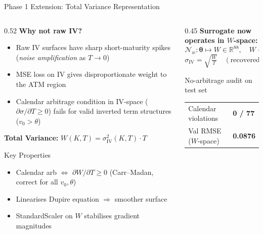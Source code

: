 \documentclass[aspectratio=169, 10pt]{beamer}
\begin{document}
\begin{frame}{Phase 1 Extension: Total Variance Representation}
  \begin{columns}[T]
    \begin{column}{0.52\textwidth}
      \textbf{Why not raw IV?}\\[0.4em]
      \begin{itemize}\small
        \item Raw IV surfaces have sharp short-maturity spikes
              (\emph{noise amplification} as $T\to0$)
        \item MSE loss on IV gives disproportionate weight to the ATM region
        \item Calendar arbitrage condition in IV-space
              ($\partial\sigma/\partial T\ge0$) fails for valid
              inverted term structures ($v_0>\theta$)
      \end{itemize}
      \vspace{0.5em}
      \textbf{Total Variance:}  $W(K,T) = \sigma_{\mathrm{IV}}^2(K,T)\cdot T$
      \vspace{0.3em}
      \begin{alertblock}{Key Properties}
        \small
        \begin{itemize}
          \item[$\checkmark$] Calendar arb $\Leftrightarrow$ $\partial W/\partial T \ge 0$
                             (Carr--Madan, correct for all $v_0,\theta$)
          \item[$\checkmark$] Linearises Dupire equation $\Rightarrow$ smoother surface
          \item[$\checkmark$] StandardScaler on $W$ stabilises gradient magnitudes
        \end{itemize}
      \end{alertblock}
    \end{column}

    \begin{column}{0.45\textwidth}
      \textbf{Surrogate now operates in $W$-space:}
      \[
        \mathcal{N}_w:\boldsymbol\theta\mapsto W\in\mathbb{R}^{88},
        \quad W = \sigma^2\cdot T
      \]
      \[
        \sigma_{\mathrm{IV}} = \sqrt{\tfrac{W}{T}}
        \quad(\text{recovered at inference})
      \]
      \vspace{0.3em}
      \begin{block}{No-arbitrage audit on test set}
        \small
        \begin{tabular}{@{}ll@{}}
          Calendar violations & \textbf{0 / 77} \\
          Val RMSE ($W$-space) & \textbf{0.0876} \\
        \end{tabular}
      \end{block}
    \end{column}
  \end{columns}
\end{frame}
\end{document}
